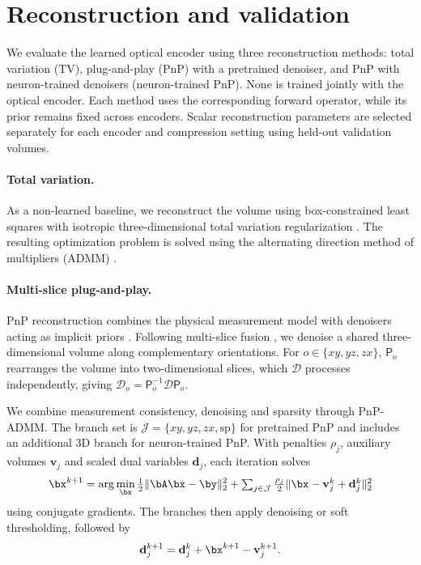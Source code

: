 \section{Reconstruction and validation}
\label{sec:s:decoders}

We evaluate the learned optical encoder using three reconstruction methods: total variation (TV), plug-and-play (PnP) with a pretrained denoiser, and PnP with neuron-trained denoisers (neuron-trained PnP). None is trained jointly with the optical encoder. Each method uses the corresponding forward operator, while its prior remains fixed across encoders. Scalar reconstruction parameters are selected separately for each encoder and compression setting using held-out validation volumes.

\paragraph{Total variation.} As a non-learned baseline, we reconstruct the volume using box-constrained least squares with isotropic three-dimensional total variation regularization \cite{rudin1992}. The resulting optimization problem is solved using the alternating direction method of multipliers (ADMM) \cite{boyd2011}.

\paragraph{Multi-slice plug-and-play.} PnP reconstruction combines the physical measurement model with denoisers acting as implicit priors \cite{venkatakrishnan2013,kamilov2023pnp}. Following multi-slice fusion \cite{majee2021}, we denoise a shared three-dimensional volume along complementary orientations. For $o\in\{xy,yz,zx\}$, $\mathsf P_o$ rearranges the volume into two-dimensional slices, which $\mathcal D$ processes independently, giving $\mathcal D_o=\mathsf P_o^{-1}\mathcal D\mathsf P_o$.

We combine measurement consistency, denoising and sparsity through PnP-ADMM. The branch set is $\mathcal J=\{xy,yz,zx,\mathrm{sp}\}$ for pretrained PnP and includes an additional $\mathrm{3D}$ branch for neuron-trained PnP. With penalties $\rho_j$, auxiliary volumes $\mathbf v_j$ and scaled dual variables $\mathbf d_j$, each iteration solves
\begin{equation}
\bx^{k+1}=\arg\min_{\bx}\tfrac12\|\bA\bx-\by\|_2^2+\textstyle\sum_{j\in\mathcal J}\tfrac{\rho_j}{2}\|\bx-\mathbf v_j^k+\mathbf d_j^k\|_2^2
\label{eq:admm}
\end{equation}
using conjugate gradients. The branches then apply denoising or soft thresholding, followed by
\begin{equation*}
\mathbf d_j^{k+1}=\mathbf d_j^k+\bx^{k+1}-\mathbf v_j^{k+1}.
\end{equation*}

